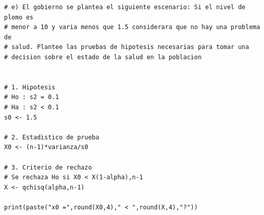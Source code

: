 \documentclass[12pt,a4paper]{article}
\begin{document}
\begin{lstlisting}
# e) El gobierno se plantea el siguiente escenario: Si el nivel de plomo es
# menor a 10 y varia menos que 1.5 considerara que no hay una problema de 
# salud. Plantee las pruebas de hipotesis necesarias para tomar una 
# decision sobre el estado de la salud en la poblacion


# 1. Hipotesis
# Ho : s2 = 0.1
# Ha : s2 < 0.1
s0 <- 1.5

# 2. Estadistico de prueba
X0 <- (n-1)*varianza/s0

# 3. Criterio de rechazo
# Se rechaza Ho si X0 < X(1-alpha),n-1
X <- qchisq(alpha,n-1)

print(paste("x0 =",round(X0,4)," < ",round(X,4),"?"))

\end{lstlisting}
\end{document}
